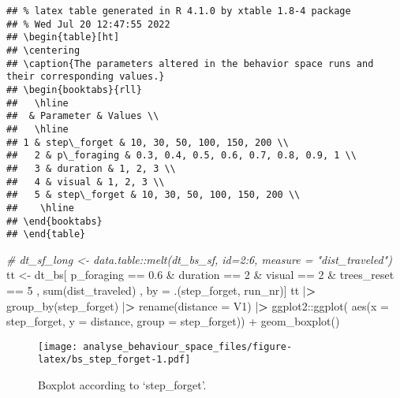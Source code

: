 \documentclass[
]{article}
\newenvironment{Shaded}{\begin{snugshade}}{\end{snugshade}}
\newcommand{\AttributeTok}[1]{\textcolor[rgb]{0.77,0.63,0.00}{#1}}
\newcommand{\CommentTok}[1]{\textcolor[rgb]{0.56,0.35,0.01}{\textit{#1}}}
\newcommand{\DecValTok}[1]{\textcolor[rgb]{0.00,0.00,0.81}{#1}}
\newcommand{\ErrorTok}[1]{\textcolor[rgb]{0.64,0.00,0.00}{\textbf{#1}}}
\newcommand{\FloatTok}[1]{\textcolor[rgb]{0.00,0.00,0.81}{#1}}
\newcommand{\FunctionTok}[1]{\textcolor[rgb]{0.00,0.00,0.00}{#1}}
\newcommand{\NormalTok}[1]{#1}
\newcommand{\OtherTok}[1]{\textcolor[rgb]{0.56,0.35,0.01}{#1}}
\newcommand{\SpecialCharTok}[1]{\textcolor[rgb]{0.00,0.00,0.00}{#1}}
\begin{document}
\begin{verbatim}
## % latex table generated in R 4.1.0 by xtable 1.8-4 package
## % Wed Jul 20 12:47:55 2022
## \begin{table}[ht]
## \centering
## \caption{The parameters altered in the behavior space runs and their corresponding values.} 
## \begin{booktabs}{rll}
##   \hline
##  & Parameter & Values \\ 
##   \hline
## 1 & step\_forget & 10, 30, 50, 100, 150, 200 \\ 
##   2 & p\_foraging & 0.3, 0.4, 0.5, 0.6, 0.7, 0.8, 0.9, 1 \\ 
##   3 & duration & 1, 2, 3 \\ 
##   4 & visual & 1, 2, 3 \\ 
##   5 & step\_forget & 10, 30, 50, 100, 150, 200 \\ 
##    \hline
## \end{booktabs}
## \end{table}
\end{verbatim}

\begin{Shaded}
\begin{Highlighting}[]
\CommentTok{\# dt\_sf\_long \textless{}{-} data.table::melt(dt\_bs\_sf, id=2:6, measure = "dist\_traveled")}
\NormalTok{tt }\OtherTok{\textless{}{-}}\NormalTok{ dt\_bs[ }
\NormalTok{    p\_foraging }\SpecialCharTok{==} \FloatTok{0.6}
    \SpecialCharTok{\&}\NormalTok{ duration }\SpecialCharTok{==} \DecValTok{2}
    \SpecialCharTok{\&}\NormalTok{ visual }\SpecialCharTok{==} \DecValTok{2}
    \SpecialCharTok{\&}\NormalTok{ trees\_reset }\SpecialCharTok{==} \DecValTok{5}
\NormalTok{    , }\FunctionTok{sum}\NormalTok{(dist\_traveled) , by }\OtherTok{=}\NormalTok{ .(step\_forget, run\_nr)]}
\NormalTok{tt }\SpecialCharTok{|}\ErrorTok{\textgreater{}} \FunctionTok{group\_by}\NormalTok{(step\_forget) }\SpecialCharTok{|}\ErrorTok{\textgreater{}} \FunctionTok{rename}\NormalTok{(}\AttributeTok{distance =}\NormalTok{ V1) }\SpecialCharTok{|}\ErrorTok{\textgreater{}} 
\NormalTok{ggplot2}\SpecialCharTok{::}\FunctionTok{ggplot}\NormalTok{( }\FunctionTok{aes}\NormalTok{(}\AttributeTok{x =}\NormalTok{ step\_forget, }\AttributeTok{y =}\NormalTok{ distance, }\AttributeTok{group =}\NormalTok{ step\_forget)) }\SpecialCharTok{+} \FunctionTok{geom\_boxplot}\NormalTok{()}
\end{Highlighting}
\end{Shaded}

\begin{figure}
\centering
\texttt{[image: analyse\_behaviour\_space\_files/figure-latex/bs\_step\_forget-1.pdf]}
\caption{Boxplot according to `step\_forget'.}
\end{figure}
\end{document}
